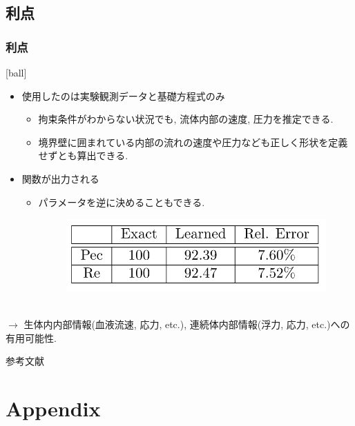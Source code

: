 \documentclass[xcolor=dvipsnames,hyperref={breaklinks=true},mathserif,professionalfont,dvipdfmx,12pt]{beamer}
\begin{document}
\subsection{利点}
\begin{frame}
  \frametitle{利点}
  [ball]
  \begin{itemize}
    \item 使用したのは実験観測データと基礎方程式のみ
    \begin{itemize}
      \item 拘束条件がわからない状況でも, 流体内部の速度, 圧力を推定できる.
      \item 境界壁に囲まれている内部の流れの速度や圧力なども正しく形状を定義せずとも算出できる.
    \end{itemize}
    \item 関数が出力される
    \begin{itemize}
      \item パラメータを逆に決めることもできる.
      \begin{figure}[H]
        \centering
          \includegraphics[width=0.5\linewidth]{figure/fig7.png}
      \end{figure}
    \end{itemize}
  \end{itemize}
  \\
  \footnotesize$\rightarrow$ 生体内内部情報(血液流速, 応力, etc.), 連続体内部情報(浮力, 応力, etc.)への有用可能性.\normalsize
\end{frame}
\begin{frame}[allowframebreaks]{参考文献}
  \printbibliography
\end{frame}

\section{Appendix}
\end{document}

